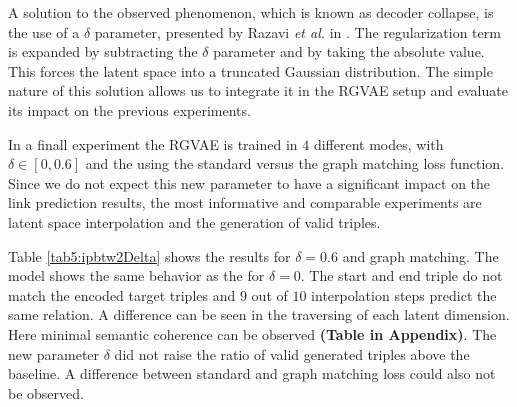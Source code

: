 A solution to the observed phenomenon, which is known as decoder collapse, is the use of a $\delta$ parameter, presented by Razavi \textit{et al.} in \cite{razavi_preventing_2018}. The regularization term is expanded by subtracting the $\delta$ parameter and by taking the absolute value. This forces the latent space into a truncated Gaussian distribution. The simple nature of this solution allows us to integrate it in the RGVAE setup and evaluate its impact on the previous experiments.

In a finall experiment the RGVAE is trained in $4$ different modes, with $\delta \in [0, 0.6]$ and the using the standard versus the graph matching loss function. Since we do not expect this new parameter to have a significant impact on the link prediction results, the most informative and comparable experiments are latent space interpolation and the generation of valid triples.

Table \ref{tab5:ipbtw2Delta} shows the results for $\delta = 0.6$ and graph matching. The model shows the same behavior as the for $\delta = 0$. The start and end triple do not match the encoded target triples and $9$ out of $10$ interpolation steps predict the same relation. A difference can be seen in the traversing of each latent dimension. Here minimal semantic coherence can be observed \textbf{(Table in Appendix)}.
The new parameter $\delta$ did not raise the ratio of valid generated triples above the baseline.
A difference between standard and graph matching loss could also not be observed. 

